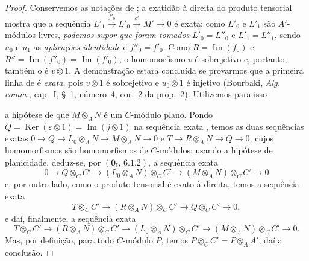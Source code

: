 \begin{proof}
Conservemos as notações de ; a exatidão à direita do produto tensorial mostra que a sequência $L'_1\xrightarrow{f'_0}L'_0\xrightarrow{\varepsilon'}M'\to0$ é exata; como $L'_0$ e $L'_1$ são $A'$-módulos livres, \emph{podemos supor que foram tomados} $L'_0=L''_0$ e $L'_1=L''_1$, sendo $u_0$ e $u_1$ as \emph{aplicações identidade} e $f''_0=f'_0$. Como $R=\operatorname{Im}(f_0)$ e $R''=\operatorname{Im}(f''_0)=\operatorname{Im}(f'_0)$, o homomorfismo $v$ é sobrejetivo e, portanto, também o é $v\otimes1$. A demonstração estará concluída se provarmos que a primeira linha de  é \emph{exata}, pois $v\otimes1$ é sobrejetivo e $u_0\otimes1$ é injetivo (Bourbaki, \emph{Alg. comm.}, cap.~I, \S~1, número~4, cor.~2 da prop.~2). Utilizemos para isso


a hipótese de que $M\otimes_AN$ é um $C$-módulo plano. Pondo $Q=\operatorname{Ker}(\varepsilon\otimes1)=\operatorname{Im}(j\otimes1)$ na sequência exata , temos as duas sequências exatas $0\to Q\to L_0\otimes_AN\to M\otimes_AN\to0$ e $T\to R\otimes_AN\to Q\to0$, cujos homomorfismos são homomorfismos de $C$-módulos; usando a hipótese de planicidade, deduz-se, por $(\mathbf 0_{\mathrm I},\,6.1.2)$, a sequência exata
\[
0\to Q\otimes_CC'\to(L_0\otimes_AN)\otimes_CC'
\to(M\otimes_AN)\otimes_CC'\to0
\]
e, por outro lado, como o produto tensorial é exato à direita, temos a sequência exata
\[
T\otimes_CC'\to(R\otimes_AN)\otimes_CC'\to Q\otimes_CC'\to0,
\]
e daí, finalmente, a sequência exata
\[
T\otimes_CC'\to(R\otimes_AN)\otimes_CC'\to
(L_0\otimes_AN)\otimes_CC'\to(M\otimes_AN)\otimes_CC'\to0.
\]
Mas, por definição, para todo $C$-módulo $P$, temos $P\otimes_CC'=P\otimes_AA'$, daí a conclusão.
\end{proof}

